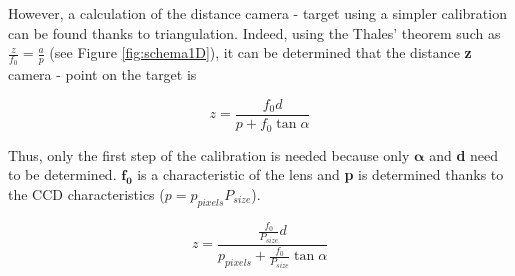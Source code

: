 However, a calculation of the distance camera - target using a simpler calibration can be found thanks to triangulation. Indeed, using the Thales' theorem such as $\frac{z}{f_0} = \frac{a}{p}$ (see Figure \ref{fig:schema1D}), it can be determined that the distance \textbf{z} camera - point on the target is


\begin{equation*}
z = \frac{f_0d}{p+f_0 \tan \alpha}
\end{equation*}

Thus, only the first step of the calibration is needed because only $\bm{\alpha}$ and \textbf{d} need to be determined. $\bm{f_0}$ is a characteristic of the lens and \textbf{p} is determined thanks to the CCD characteristics ($p = p_{pixels} P_{size}$).

\begin{equation}
z = \frac{\frac{f_0}{P_{size}}d}{p_{pixels}+\frac{f_0}{P_{size}} \tan \alpha}
\label{eq:formule1D_2}
\end{equation}